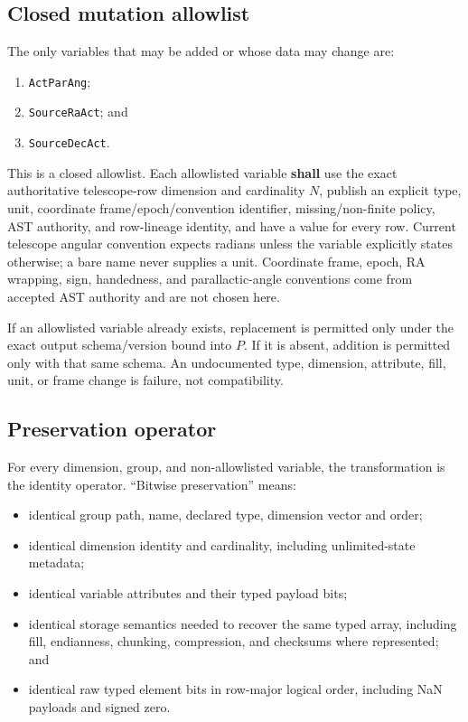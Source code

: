 \documentclass[11pt]{article}
\newcommand{\code}[1]{\texttt{#1}}
\newcommand{\shall}{\textbf{shall}}
\begin{document}
\subsection{Closed mutation allowlist}

The only variables that may be added or whose data may change are:
\begin{enumerate}
\item \code{ActParAng};
\item \code{SourceRaAct}; and
\item \code{SourceDecAct}.
\end{enumerate}

This is a closed allowlist.  Each allowlisted variable \shall{} use the exact
authoritative telescope-row dimension and cardinality $N$, publish an explicit
type, unit, coordinate frame/epoch/convention identifier, missing/non-finite
policy, AST authority, and row-lineage identity, and have a value for every
row.  Current telescope angular convention expects radians unless the variable
explicitly states otherwise; a bare name never supplies a unit.  Coordinate
frame, epoch, RA wrapping, sign, handedness, and parallactic-angle conventions
come from accepted AST authority and are not chosen here.

If an allowlisted variable already exists, replacement is permitted only under
the exact output schema/version bound into $P$.  If it is absent, addition is
permitted only with that same schema.  An undocumented type, dimension,
attribute, fill, unit, or frame change is failure, not compatibility.

\subsection{Preservation operator}

For every dimension, group, and non-allowlisted variable, the transformation
is the identity operator.  ``Bitwise preservation'' means:

\begin{itemize}
\item identical group path, name, declared type, dimension vector and order;
\item identical dimension identity and cardinality, including unlimited-state
  metadata;
\item identical variable attributes and their typed payload bits;
\item identical storage semantics needed to recover the same typed array,
  including fill, endianness, chunking, compression, and checksums where
  represented; and
\item identical raw typed element bits in row-major logical order, including
  NaN payloads and signed zero.
\end{itemize}
\end{document}

